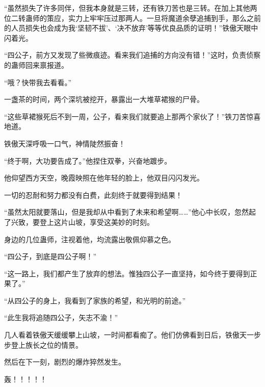 \begin{this_body}
“虽然损失了许多同伴，但我本身就是三转，还有铁刀苦也是三转。在加上其他两位二转蛊师的策应，实力上牢牢压过那两人。一旦将魔道余孽追捕到手，那么之前的人员损失也会成为我‘坚韧不拔’、‘决不放弃’等等优良品质的证明！”铁傲天眼中闪着光。

“四公子，前方又发现了些微痕迹。看来我们追捕的方向没有错！”这时，负责侦察的蛊师回来禀报道。

“哦？快带我去看看。”

一盏茶的时间，两个深坑被挖开，暴露出一大堆草裙猴的尸骨。

“这些草裙猴死后不到一周，公子，看来我们就要追上那两个家伙了！”铁刀苦惊喜地道。

铁傲天深呼吸一口气，神情陡然振奋！

“终于啊，大功要告成了。”他捏住双拳，兴奋地踱步。

他仰望西方天空，晚霞映照在他年轻的脸上，他双目闪闪发光。

一切的忍耐和努力都没有白费，此刻终于就要得到结果！

“虽然太阳就要落山，但是我却从中看到了未来和希望啊……”他心中长叹，忽然起了兴致，要登上这片山坡，享受这美妙的时刻。

身边的几位蛊师，注视着他，均流露出敬佩仰慕之色。

“四公子，到底是四公子啊！”

“这一路上，我们都产生了放弃的想法。惟独四公子一直坚持，如今终于要得到正果了。”

“从四公子的身上，我看到了家族的希望，和光明的前途。”

“此生我将追随四公子，矢志不渝！”

几人看着铁傲天缓缓攀上山坡，一时间都看痴了。他们仿佛看到日后，铁傲天一步步登上族长之位的情景。

然后在下一刻，剧烈的爆炸猝然发生。

轰！！！！！

\end{this_body}

